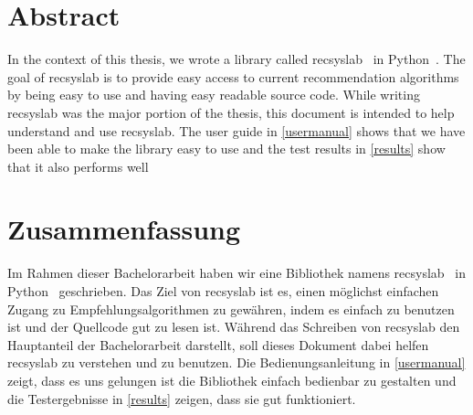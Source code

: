 \begingroup
\let\clearpage\relax
\let\cleardoublepage\relax
\let\cleardoublepage\relax

\chapter*{Abstract}
In the context of this thesis, we wrote a library called recsyslab~\cite{recsyslab} 
in Python~\cite{python}. The goal of recsyslab is
to provide easy access to current recommendation algorithms by being easy to use and 
having easy readable source code.
While writing recsyslab was the major portion of the thesis,
this document is intended to help understand and use recsyslab.
The user guide in \ref{usermanual} shows that we have been able to make the library easy to use
and the test results in \ref{results} show that it also performs well


\vfill

\chapter*{Zusammenfassung}
Im Rahmen dieser Bachelorarbeit haben wir eine Bibliothek namens recsyslab~\cite{recsyslab} 
in Python~\cite{python} geschrieben. Das Ziel von recsyslab ist es, einen m\"oglichst einfachen Zugang zu 
Empfehlungsalgorithmen zu gew\"ahren, indem es einfach zu benutzen ist und der Quellcode gut zu lesen ist.
W\"ahrend das Schreiben von recsyslab den Hauptanteil der Bachelorarbeit
darstellt, soll dieses Dokument dabei helfen recsyslab zu verstehen und zu benutzen.
Die Bedienungsanleitung in \ref{usermanual} zeigt, dass es uns gelungen ist die Bibliothek einfach
bedienbar zu gestalten und die Testergebnisse in \ref{results} zeigen, dass sie gut funktioniert.


\endgroup			

\vfill

\cleardoublepage
